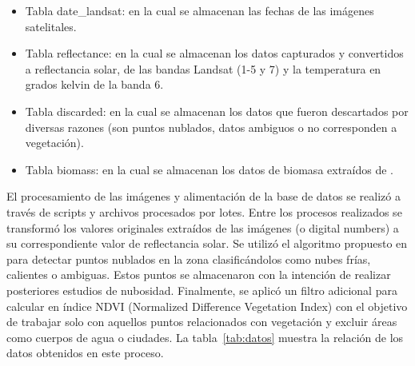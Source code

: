 \begin{itemize}
 \item Tabla date\_landsat: en la cual se almacenan las fechas de las imágenes satelitales.
 \item Tabla reflectance: en la cual se almacenan los datos capturados y convertidos a reflectancia solar, de las bandas Landsat (1-5 y 7) y la temperatura en grados kelvin de la banda 6.
 \item Tabla discarded: en la cual se almacenan los datos que fueron descartados por diversas razones (son puntos nublados, datos ambiguos o no corresponden a vegetación).
 \item Tabla biomass: en la cual se almacenan los datos de biomasa extraídos de \cite{baccini2008afirst}.
\end{itemize}

El procesamiento de las imágenes y alimentación de la base de datos se realizó a través de scripts y archivos procesados por lotes.  Entre los procesos realizados se transformó los valores originales extraídos de las imágenes (o digital numbers) a su correspondiente valor de reflectancia solar.  Se utilizó el algoritmo propuesto en \cite{irish2000landsat} para detectar puntos nublados en la zona clasificándolos como nubes frías, calientes o ambiguas.  Estos puntos se almacenaron con la intención de realizar posteriores estudios de nubosidad.  Finalmente, se aplicó un filtro adicional para calcular en índice NDVI (Normalized Difference Vegetation Index) con el objetivo de trabajar solo con aquellos puntos relacionados con vegetación y excluir áreas como cuerpos de agua o ciudades.  La tabla~\ref{tab:datos} muestra la relación de los datos obtenidos en este proceso.

